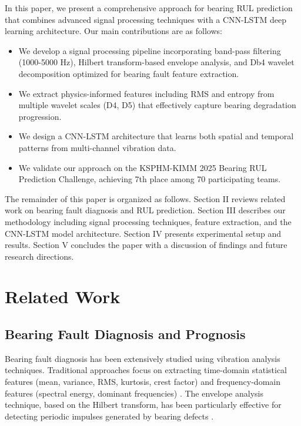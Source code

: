 \documentclass[conference,twocolumn]{IEEEtran}
\begin{document}
In this paper, we present a comprehensive approach for bearing RUL prediction that combines advanced signal processing techniques with a CNN-LSTM deep learning architecture. Our main contributions are as follows:

\begin{itemize}
    \item We develop a signal processing pipeline incorporating band-pass filtering (1000-5000 Hz), Hilbert transform-based envelope analysis, and Db4 wavelet decomposition optimized for bearing fault feature extraction.
    \item We extract physics-informed features including RMS and entropy from multiple wavelet scales (D4, D5) that effectively capture bearing degradation progression.
    \item We design a CNN-LSTM architecture that learns both spatial and temporal patterns from multi-channel vibration data.
    \item We validate our approach on the KSPHM-KIMM 2025 Bearing RUL Prediction Challenge, achieving 7th place among 70 participating teams.
\end{itemize}

The remainder of this paper is organized as follows. Section II reviews related work on bearing fault diagnosis and RUL prediction. Section III describes our methodology including signal processing techniques, feature extraction, and the CNN-LSTM model architecture. Section IV presents experimental setup and results. Section V concludes the paper with a discussion of findings and future research directions.

\section{Related Work}

\subsection{Bearing Fault Diagnosis and Prognosis}

Bearing fault diagnosis has been extensively studied using vibration analysis techniques. Traditional approaches focus on extracting time-domain statistical features (mean, variance, RMS, kurtosis, crest factor) and frequency-domain features (spectral energy, dominant frequencies) \cite{randall2011rolling}. The envelope analysis technique, based on the Hilbert transform, has been particularly effective for detecting periodic impulses generated by bearing defects \cite{mccormick1998cyclostationarity}.
\end{document}
